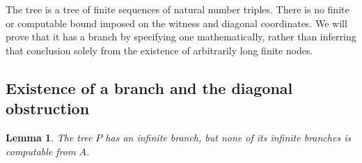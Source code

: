 \documentclass[11pt]{article}
\newtheorem{lemma}[theorem]{Lemma}
\theoremstyle{definition}
\begin{document}
The tree is a tree of finite sequences of natural number triples. There is
no finite or computable bound imposed on the witness and diagonal
coordinates. We will prove that it has a branch by specifying one
mathematically, rather than inferring that conclusion solely from the
existence of arbitrarily long finite nodes.

\subsection{Existence of a branch and the diagonal obstruction}

\begin{lemma}\label{lem:branches}
The tree $P$ has an infinite branch, but none of its infinite branches is
computable from $A$.
\end{lemma}
\end{document}
